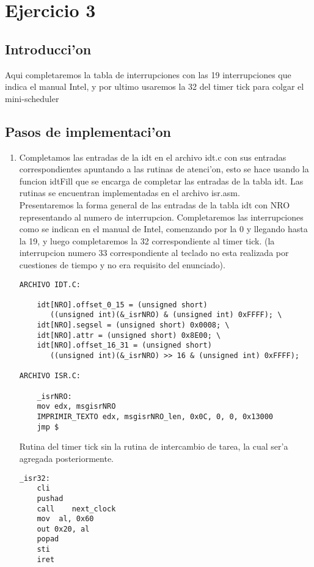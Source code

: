 \documentclass[11pt]{article}
\begin{document}
\newpage

\section{Ejercicio 3}
\subsection{Introducci'on}
Aqui completaremos la tabla de interrupciones con las 19 interrupciones que indica el manual Intel, y por ultimo usaremos la 32 del timer tick para colgar el mini-scheduler
\subsection{Pasos de implementaci'on}
\begin{enumerate}
\item
Completamos las entradas de la idt en el archivo idt.c con sus entradas correspondientes apuntando a las rutinas de atenci'on, esto se hace usando la funcion idtFill que se encarga de completar las entradas de la tabla idt. Las rutinas se encuentran implementadas en el archivo isr.asm. \\
Presentaremos la forma general de las entradas de la tabla idt con NRO representando al numero de interrupcion. Completaremos las interrupciones como se indican en el manual de Intel, comenzando por la 0 y llegando hasta la 19, y luego completaremos la 32 correspondiente al timer tick. (la interrupcion numero 33 correspondiente al teclado no esta realizada por cuestiones de tiempo y no era requisito del enunciado).\\
\begin{lstlisting}[frame=single]
ARCHIVO IDT.C:

	idt[NRO].offset_0_15 = (unsigned short) 
	   ((unsigned int)(&_isrNRO) & (unsigned int) 0xFFFF); \
	idt[NRO].segsel = (unsigned short) 0x0008; \
	idt[NRO].attr = (unsigned short) 0x8E00; \
	idt[NRO].offset_16_31 = (unsigned short) 
	   ((unsigned int)(&_isrNRO) >> 16 & (unsigned int) 0xFFFF);

ARCHIVO ISR.C:

	_isrNRO:
	mov edx, msgisrNRO
	IMPRIMIR_TEXTO edx, msgisrNRO_len, 0x0C, 0, 0, 0x13000
	jmp $
\end{lstlisting}
Rutina del timer tick sin la rutina de intercambio de tarea, la cual ser'a agregada posteriormente.
\begin{lstlisting}[frame=single]
_isr32:
	cli
	pushad
	call	next_clock
	mov  al, 0x60
	out 0x20, al
	popad
	sti
	iret


\end{lstlisting}
\end{enumerate}
\end{document}
